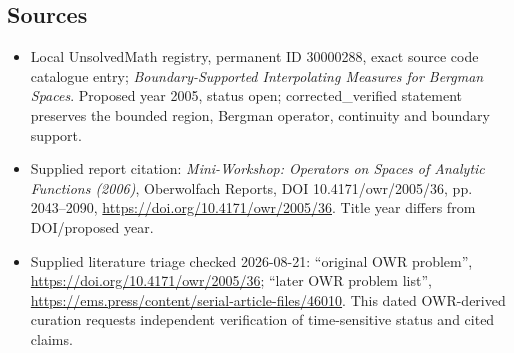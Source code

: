 \documentclass[11pt]{article}
\begin{document}
\subsection{Sources}
\begin{itemize}
\item Local UnsolvedMath registry, permanent ID 30000288, exact source code catalogue entry; \emph{Boundary-Supported Interpolating Measures for Bergman Spaces}. Proposed year 2005, status open; corrected\_verified statement preserves the bounded region, Bergman operator, continuity and boundary support.
\item Supplied report citation: \emph{Mini-Workshop: Operators on Spaces of Analytic Functions (2006)}, Oberwolfach Reports, DOI 10.4171/owr/2005/36, pp. 2043--2090, \url{https://doi.org/10.4171/owr/2005/36}. Title year differs from DOI/proposed year.
\item Supplied literature triage checked 2026-08-21: ``original OWR problem'', \url{https://doi.org/10.4171/owr/2005/36}; ``later OWR problem list'', \url{https://ems.press/content/serial-article-files/46010}. This dated OWR-derived curation requests independent verification of time-sensitive status and cited claims.
\end{itemize}
\end{document}
